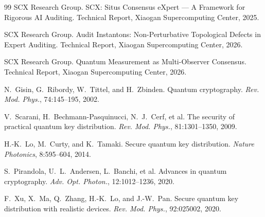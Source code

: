 \documentclass[11pt,a4paper]{article}
\theoremstyle{plain}
\theoremstyle{definition}
\theoremstyle{remark}
\begin{document}
\begin{thebibliography}{99}
SCX Research Group.
\newblock SCX: Situs Consensus eXpert — A Framework for Rigorous AI Auditing.
\newblock Technical Report, Xiaogan Supercomputing Center, 2025.

SCX Research Group.
\newblock Audit Instantons: Non-Perturbative Topological Defects in Expert
Auditing.
\newblock Technical Report, Xiaogan Supercomputing Center, 2026.

SCX Research Group.
\newblock Quantum Measurement as Multi-Observer Consensus.
\newblock Technical Report, Xiaogan Supercomputing Center, 2026.

N.~Gisin, G.~Ribordy, W.~Tittel, and H.~Zbinden.
\newblock Quantum cryptography.
\newblock \textit{Rev. Mod. Phys.}, 74:145--195, 2002.

V.~Scarani, H.~Bechmann-Pasquinucci, N.~J.~Cerf, et al.
\newblock The security of practical quantum key distribution.
\newblock \textit{Rev. Mod. Phys.}, 81:1301--1350, 2009.

H.-K.~Lo, M.~Curty, and K.~Tamaki.
\newblock Secure quantum key distribution.
\newblock \textit{Nature Photonics}, 8:595--604, 2014.

S.~Pirandola, U.~L.~Andersen, L.~Banchi, et al.
\newblock Advances in quantum cryptography.
\newblock \textit{Adv. Opt. Photon.}, 12:1012--1236, 2020.

F.~Xu, X.~Ma, Q.~Zhang, H.-K.~Lo, and J.-W.~Pan.
\newblock Secure quantum key distribution with realistic devices.
\newblock \textit{Rev. Mod. Phys.}, 92:025002, 2020.

\end{thebibliography}
\end{document}
